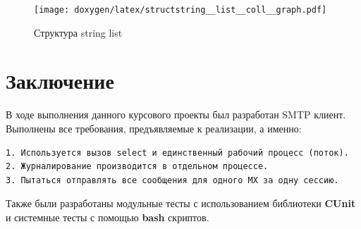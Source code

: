 \documentclass[a4paper,12pt]{article}
\begin{document}
\begin{figure}[h]
\centering
\texttt{[image: doxygen/latex/structstring\_\_list\_\_coll\_\_graph.pdf]}
\caption{Структура string list}
\label{fig:struct_string_list}
\end{figure}

\section{Заключение}
В ходе выполнения данного курсового проекты был разработан SMTP клиент.
Выполнены все требования, предъявляемые к реализации, а именно:

\begin{Verbatim}
1. Используется вызов select и единственный рабочий процесс (поток).
2. Журналирование производится в отдельном процессе.
3. Пытаться отправлять все сообщения для одного MX за одну сессию.
\end{Verbatim}

Также были разработаны модульные тесты с использованием библиотеки \textbf{CUnit} и системные тесты с помощью \textbf{bash} скриптов.
\end{document}
